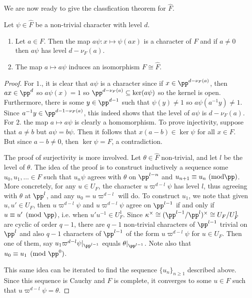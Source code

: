 We are now ready to give the classfication theorem for $\hat{F}$.

\begin{thm}
    Let $\psi\in\hat{F}$ be a non-trivial character with level $d$. 
    \begin{enumerate}
        \item Let $a\in F$. Then the map $a\psi:x\mapsto\psi(ax)$ is a character of $F$ and if $a\neq0$ then $a\psi$ has level $d-\nu_F(a)$.
        \item The map $a\mapsto a\psi$ induces an isomorphism $F\cong\hat{F}$.
    \end{enumerate}
\end{thm}
\begin{proof}
    For $1.$, it is clear that $a\psi$ is a character since if $x\in\pp^{d-\nu_F(a)}$, then $ax\in\pp^d$ so $a\psi(x)=1$ so $\pp^{d-\nu_F(a)}\subseteq\ker(a\psi)$ so the kernel is open. Furthermore, there is some $y\in\pp^{d-1}$ such that $\psi(y)\neq1$ so $a\psi(a^{-1}y)\neq1$. Since $a^{-1}y\in\pp^{d-1-\nu_F(a)}$, this indeed shows that the level of $a\psi$ is $d-\nu_F(a)$.
    For $2.$ the map $a\mapsto a\psi$ is clearly a homomorphism. To prove injectivity, suppose that $a\neq b$ but $a\psi=b\psi$. Then it follows that $x(a-b)\in\ker\psi$ for all $x\in F$. But since $a-b\neq 0$, then $\ker\psi=F$, a contradiction.

    The proof of surjectivity is more involved. Let $\theta\in\hat{F}$ non-trivial, and let $l$ be the level of $\theta$. The idea of the proof is to construct inductively a sequence some $u_0,u_1,\ldots\in F$ such that $u_n\psi$ agrees with $\theta$ on $\pp^{l-n}$ and $u_{n+1}\equiv u_n\ (\mathrm{mod }\pp)$. More concretely, for any $u\in U_F$, the character $u\varpi^{d-l}\psi$ has level $l$, thus agreeing with $\theta$ at $\pp^l$, and any $u_0=u\varpi^{d-l}$ will do. To construct $u_1$, we note that given $u,u'\in U_F$, then $u\varpi^{d-l}\psi$ and $u\varpi^{d-l}\psi$ agree on $\pp^{l-1}$ if and only if $u\equiv u'\pmod{\pp}$, i.e. when $u'u^{-1}\in U_F^1$. Since $\kappa^{\times}\cong(\pp^{l-1}/\pp^l)^{\times}\cong U_F/U_F^1$ are cyclic of order $q-1$, there are $q-1$ non-trivial characters of $\pp^{l-1}$ trivial on $\pp^l$ and also $q-1$ characters of $\pp^{l-1}$ of the form $u\varpi^{d-l}\psi$ for $u\in U_F$. Then one of them, say $u_1\varpi^{d-l}\psi|_{\pp^{l-1}}$ equals $\theta|_{\pp^{l-1}}$. Note also that $u_0\equiv u_1\pmod{\pp^0}$.

    This same idea can be iterated to find the sequence $\{u_n\}_{n\geq1}$ described above. Since this sequence is Cauchy and $F$ is complete, it converges to some $u\in F$ such that $u\varpi^{d-l}\psi=\theta$.
\end{proof}